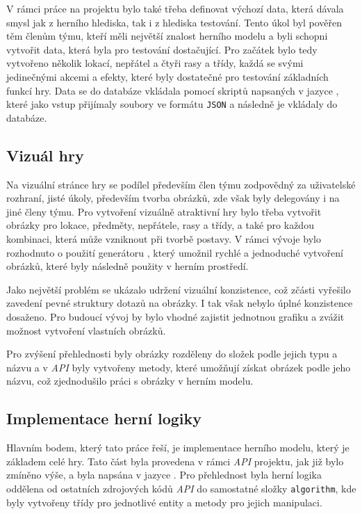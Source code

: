 V rámci práce na projektu bylo také třeba definovat výchozí data, která dávala smysl jak z herního hlediska, tak i z hlediska testování. Tento úkol byl pověřen těm členům týmu, kteří měli největší znalost herního modelu a byli schopni vytvořit data, která byla pro testování dostačující. Pro začátek bylo tedy vytvořeno několik lokací, nepřátel a čtyři rasy a třídy, každá se svými jedinečnými akcemi a efekty, které byly dostatečné pro testování základních funkcí hry. Data se do databáze vkládala pomocí skriptů napsaných v jazyce , které jako vstup přijímaly soubory ve formátu \texttt{JSON} a následně je vkládaly do databáze.

\subsection{Vizuál hry}
\label{subsec:game_visuals}

Na vizuální stránce hry se podílel především člen týmu zodpovědný za uživatelské rozhraní, jisté úkoly, především tvorba obrázků, zde však byly delegovány i na jiné členy týmu. Pro vytvoření vizuálně atraktivní hry bylo třeba vytvořit obrázky pro lokace, předměty, nepřátele, rasy a třídy, a také pro každou kombinaci, která může vzniknout při tvorbě postavy. V rámci vývoje bylo rozhodnuto o použití generátoru , který umožnil rychlé a jednoduché vytvoření obrázků, které byly následně použity v herním prostředí.

Jako největší problém se ukázalo udržení vizuální konzistence, což zčásti vyřešilo zavedení pevné struktury dotazů na obrázky. I tak však nebylo úplné konzistence dosaženo. Pro budoucí vývoj by bylo vhodné zajistit jednotnou grafiku a zvážit možnost vytvoření vlastních obrázků.

Pro zvýšení přehlednosti byly obrázky rozděleny do složek podle jejich typu a názvu a v \textit{API} byly vytvořeny metody, které umožňují získat obrázek podle jeho názvu, což zjednodušilo práci s obrázky v herním modelu.

\subsection{Implementace herní logiky}
\label{subsec:game_logic}

Hlavním bodem, který tato práce řeší, je implementace herního modelu, který je základem celé hry. Tato část byla provedena v rámci \textit{API} projektu, jak již bylo zmíněno výše, a byla napsána v jazyce . Pro přehlednost byla herní logika oddělena od ostatních zdrojových kódů \textit{API} do samostatné složky \texttt{algorithm}, kde byly vytvořeny třídy pro jednotlivé entity a metody pro jejich manipulaci.

